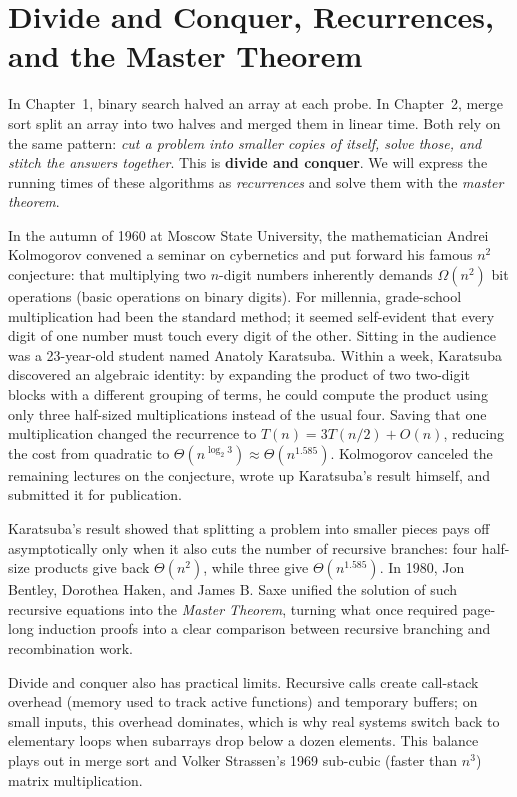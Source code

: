 \chapter{Divide and Conquer, Recurrences, and the Master Theorem}

In Chapter~1, binary search halved an array at each probe. In Chapter~2, merge
sort split an array into two halves and merged them in linear time. Both rely on
the same pattern: \emph{cut a problem into smaller copies of itself, solve
those, and stitch the answers together}. This is \textbf{divide and conquer}.
We will express the running times of these algorithms as \emph{recurrences}
and solve them with the \emph{master theorem}.

\begin{historybox}
In the autumn of 1960 at Moscow State University, the mathematician Andrei Kolmogorov
convened a seminar on cybernetics and put forward his famous $n^2$ conjecture: that multiplying two
$n$-digit numbers inherently demands $\Omega(n^2)$ bit operations (basic operations on binary digits). For millennia, grade-school
multiplication had been the standard method; it seemed self-evident that every digit of one number must
touch every digit of the other. Sitting in the audience was a 23-year-old student named Anatoly
Karatsuba. Within a week, Karatsuba discovered an algebraic identity: by expanding the product of
two two-digit blocks with a different grouping of terms, he could compute the product using only three
half-sized multiplications instead of the usual four. Saving that one multiplication changed the
recurrence to $T(n) = 3T(n/2) + O(n)$, reducing the cost from quadratic to
$\Theta(n^{\log_2 3}) \approx \Theta(n^{1.585})$. Kolmogorov canceled
the remaining lectures on the conjecture, wrote up Karatsuba's result himself, and submitted
it for publication.

Karatsuba's result showed that splitting a problem into smaller pieces pays off asymptotically only
when it also cuts the number of recursive branches: four half-size products give back $\Theta(n^2)$,
while three give $\Theta(n^{1.585})$. In 1980,
Jon Bentley, Dorothea Haken, and James B. Saxe unified the solution of such recursive equations into
the \emph{Master Theorem}, turning what once required page-long induction proofs into a clear
comparison between recursive branching and recombination work.

Divide and conquer also has practical limits. Recursive calls create call-stack overhead (memory used to track active functions) and
temporary buffers; on small inputs, this overhead dominates, which is why real systems switch back
to elementary loops when subarrays drop below a dozen elements. This balance plays out in merge sort and Volker Strassen's 1969 sub-cubic (faster than $n^3$) matrix multiplication.
\end{historybox}

